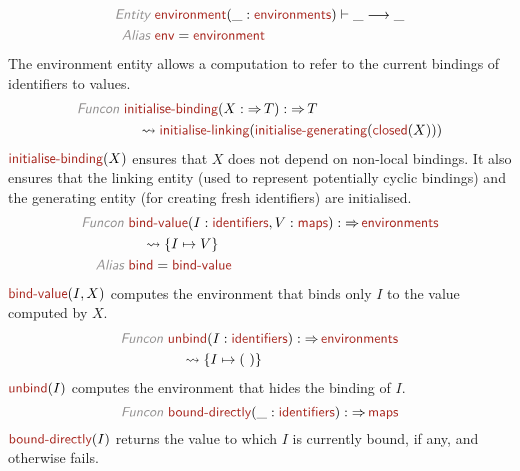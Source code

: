 \documentclass[fleqn]{article}
\newcommand{\KEY}[1]{\textsf{\textit{\color{Gray}#1}}}
\newcommand{\NAME}[2][\PLAIN]{#1{Name_#2}{\textsf{\color{Mahogany}#2}}}
\newcommand{\PLAIN}[1]{}
\newcommand{\TO}{\mathop{\Rightarrow}}
\newcommand{\TRANS}{\longrightarrow}
\begin{document}
\begin{align*}
  \KEY{Entity} ~
  & \NAME{environment}(\_:\NAME{environments}) \vdash \_ \TRANS \_
\\
  \KEY{Alias} ~
  & \NAME{env} = \NAME{environment}
\end{align*}
% 
The environment entity allows a computation to refer to the current bindings
of identifiers to values.
% 
\begin{align*}
  \KEY{Funcon} ~
  & \NAME{initialise-binding}(X:\TO T) : \TO T
\\
  & \quad {} \leadsto \NAME{initialise-linking}(\NAME{initialise-generating}(\NAME{closed}(X)))
\end{align*}
% 
$ \NAME{initialise-binding}(X) $ ensures that $ X $ does not depend on non-local bindings.
It also ensures that the linking entity (used to represent potentially cyclic
bindings) and the generating entity (for creating fresh identifiers) are 
initialised.
% 
\begin{align*}
  \KEY{Funcon} ~
  & \NAME{bind-value}(I:\NAME{identifiers}, V:\NAME{maps}) : \TO \NAME{environments}
\\
  & \quad {} \leadsto \{ I \mapsto V \}
\\
  \KEY{Alias} ~
  & \NAME{bind} = \NAME{bind-value}
\end{align*}
% 
$ \NAME{bind-value}(I, X) $ computes the environment that binds only $ I $ to the value
computed by $ X $.
% 
\begin{align*}
  \KEY{Funcon} ~
  & \NAME{unbind}(I:\NAME{identifiers}) : \TO \NAME{environments}
\\
  & \quad {} \leadsto \{ I \mapsto (~) \}
\end{align*}
% 
$ \NAME{unbind}(I) $ computes the environment that hides the binding of $ I $.
% 
\[ %
\KEY{Funcon} ~
  \NAME{bound-directly}(\_:\NAME{identifiers}) : \TO \NAME{maps}
\] %
% 
$ \NAME{bound-directly}(I) $ returns the value to which $ I $ is currently bound, if any,
and otherwise fails.
\end{document}
